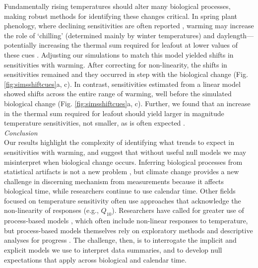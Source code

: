 \documentclass[11pt,letter]{article}
\begin{document}
Fundamentally rising temperatures should alter many biological processes, making robust methods for identifying these changes critical. In spring plant phenology, where declining sensitivities are often reported \citep{fu2015,piao2017}, warming may increase the role of `chilling' (determined mainly by winter temperatures) and daylength---potentially increasing the thermal sum required for leafout at lower values of these cues \citep{Laube:2014a}. Adjusting our simulations to match this model yielded shifts in sensitivities with warming. After correcting for non-linearity, the shifts in sensitivities remained and they occurred in step with the biological change (Fig. \ref{fig:simsshiftcues}a, c). In contrast, sensitivities estimated from a linear model showed shifts across the entire range of warming, well before the simulated biological change (Fig. \ref{fig:simsshiftcues}a, c). Further, we found that an increase in the thermal sum required for leafout should yield larger in magnitude temperature sensitivities, not smaller, as is often expected \citep[e.g.,][]{fu2015}. \\ 

\emph{Conclusion}\\
Our results highlight the complexity of identifying what trends to expect in sensitivities with warming, and suggest that without useful null models we may misinterpret when biological change occurs. Inferring biological processes from statistical artifacts is not a new problem \citep[e.g.,][]{nee2005}, but climate change provides a new challenge in discerning mechanism from measurements because it affects biological time, while researchers continue to use calendar time. Other fields focused on temperature sensitivity often use approaches that acknowledge the non-linearity of responses (e.g., $Q_{10}$). Researchers have called for greater use of process-based models \citep{keenan2019}, which often include non-linear responses to temperature, but process-based models themselves rely on exploratory methods and descriptive analyses for progress \citep{chuine2016}. The challenge, then, is to interrogate the implicit and explicit models we use to interpret data summaries, and to develop null expectations that apply across biological and calendar time. \\
\end{document}
